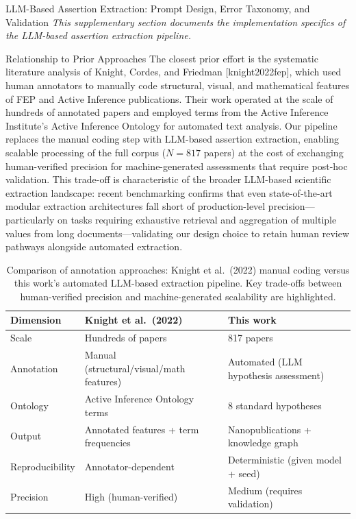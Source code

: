 \documentclass[
  ignorenonframetext,
]{beamer}
\author{\texorpdfstring{}{}}
\date{}
\providecommand{\citep}[1]{[#1]}
\begin{document}
\begin{frame}{LLM-Based Assertion Extraction:
Prompt Design, Error Taxonomy, and Validation
\label{sec:extraction_pipeline}}
\protect{}\label{llm-based-assertion-extraction-prompt-design-error-taxonomy-and-validation}
\emph{This supplementary section documents the implementation specifics
of the LLM-based assertion extraction pipeline.}

\begin{block}{Relationship to Prior Approaches}
\protect{}\label{relationship-to-prior-approaches}
The closest prior effort is the systematic literature analysis of
Knight, Cordes, and Friedman \citep{knight2022fep}, which used human
annotators to manually code structural, visual, and mathematical
features of FEP and Active Inference publications. Their work operated
at the scale of hundreds of annotated papers and employed terms from the
Active Inference Institute's Active Inference Ontology for automated
text analysis. Our pipeline replaces the manual coding step with
LLM-based assertion extraction, enabling scalable processing of the full
corpus (\(N = 817\) papers) at the cost of exchanging human-verified
precision for machine-generated assessments that require post-hoc
validation. This trade-off is characteristic of the broader LLM-based
scientific extraction landscape: recent benchmarking confirms that even
state-of-the-art modular extraction architectures fall short of
production-level precision---particularly on tasks requiring exhaustive
retrieval and aggregation of multiple values from long
documents---validating our design choice to retain human review pathways
alongside automated extraction.

\begin{table}[htbp]
\centering
\caption{Comparison of annotation approaches: Knight et al.\ (2022) manual coding versus this work's automated LLM-based extraction pipeline. Key trade-offs between human-verified precision and machine-generated scalability are highlighted.}
\label{tab:annotation_comparison}
\begin{tabular}{lll}
\toprule
\textbf{Dimension} & \textbf{Knight et al.\ (2022)} & \textbf{This work} \\
\midrule
Scale & Hundreds of papers & 817 papers \\
Annotation & Manual (structural/visual/math features) & Automated (LLM hypothesis assessment) \\
Ontology & Active Inference Ontology terms & 8 standard hypotheses \\
Output & Annotated features + term frequencies & Nanopublications + knowledge graph \\
Reproducibility & Annotator-dependent & Deterministic (given model + seed) \\
Precision & High (human-verified) & Medium (requires validation) \\
\bottomrule
\end{tabular}
\end{table}


\end{block}
\end{frame}
\end{document}
